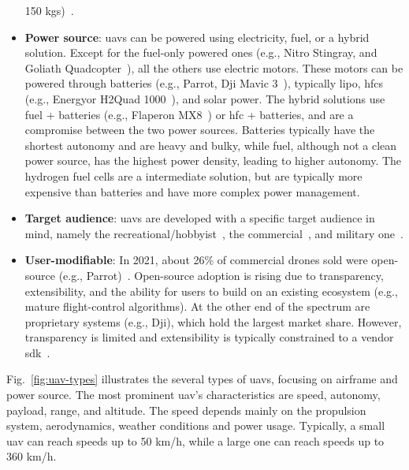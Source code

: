 \begin{itemize}
  150 kgs)~\cite{alladi2022UAVBlockain}.
%  
\item \textbf{Power source}: \glspl{uav} can be powered using electricity,
  fuel, or a hybrid solution. Except for the fuel-only powered ones (e.g., Nitro
  Stingray, and Goliath Quadcopter~\cite{gasPoweredDrone}), all the
  others use electric motors. These motors can be powered through batteries
  (e.g., Parrot\cite{parrotDrone}, Dji Mavic 3~\cite{djiMavic3Drone}),
  typically \gls{lipo}, \glspl{hfc} (e.g., Energyor H2Quad 1000~\cite{energyorDrone}), and solar power. The
  hybrid solutions use fuel + batteries (e.g., Flaperon MX8~\cite{flaperonDrone}) or \gls{hfc} + batteries, and are a compromise between the
  two power sources. Batteries typically have the shortest autonomy and are
  heavy and bulky, while fuel, although not a clean power source, has the
  highest power density, leading to higher autonomy. The hydrogen fuel cells are
  a intermediate solution, but are typically more expensive than batteries and
  have more complex power management.
%  
\item \textbf{Target audience}: \glspl{uav} are developed with a specific target
  audience in mind, namely the recreational/hobbyist~\cite{hobbykingKK2}, the commercial~\cite{skynodeXWebsite}, and
  military one~\cite{vxWorks-uav-northrop,skynodeS-noJamming-2,theDriveUAVAccident2019}.
  \item \textbf{User-modifiable}: In 2021, about 26\% of commercial drones sold
    were open-source (e.g., Parrot)~\cite{droneAnalyst2021}. Open-source
    adoption is rising due to transparency, extensibility, and the ability for
    users to build on an existing ecosystem (e.g., mature flight-control
    algorithms). At the other end of the spectrum are proprietary systems (e.g.,
    Dji), which hold the largest market share. However, transparency is limited
    and extensibility is typically constrained to a vendor
    \gls{sdk}~\cite{djiSDK}.
\end{itemize}

Fig.~\ref{fig:uav-types} illustrates the several types of \glspl{uav}, focusing
on airframe and power source. 
The most prominent \gls{uav}'s characteristics are speed, autonomy, payload,
range, and altitude. The speed depends mainly on the propulsion system,
aerodynamics, weather conditions and power usage. Typically, a small
\gls{uav} can reach speeds up to 50 km/h, while a large one can reach speeds up
to 360 km/h\cite{mohsan2022towards}.

